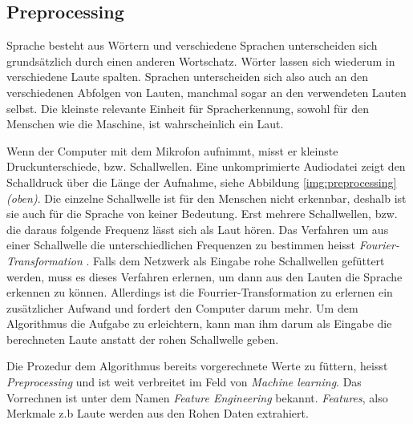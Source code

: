 \subsection{Preprocessing}
Sprache besteht aus Wörtern und verschiedene Sprachen unterscheiden sich grundsätzlich durch einen anderen Wortschatz. Wörter lassen sich wiederum in verschiedene Laute spalten. Sprachen unterscheiden sich also auch an den verschiedenen Abfolgen von Lauten, manchmal sogar an den verwendeten Lauten selbst. Die kleinste relevante Einheit für Spracherkennung, sowohl für den Menschen wie die Maschine, ist wahrscheinlich ein Laut.

Wenn der Computer mit dem Mikrofon aufnimmt, misst er kleinste Druckunterschiede, bzw. Schallwellen. Eine unkomprimierte Audiodatei zeigt den Schalldruck über die Länge der Aufnahme, siehe Abbildung \ref{img:preprocessing} \textit{(oben)}.
Die einzelne Schallwelle ist für den Menschen nicht erkennbar, deshalb ist sie auch für die Sprache von keiner Bedeutung. Erst mehrere Schallwellen, bzw. die daraus folgende Frequenz lässt sich als Laut hören. 
Das Verfahren um aus einer Schallwelle die unterschiedlichen Frequenzen zu bestimmen heisst \textit{Fourier-Transformation} \cite{fourrier}. Falls dem Netzwerk als Eingabe rohe Schallwellen gefüttert werden, muss es dieses Verfahren erlernen, um dann aus den Lauten die Sprache erkennen zu können. Allerdings ist die Fourrier-Transformation zu erlernen ein zusätzlicher Aufwand und fordert den Computer darum mehr. Um dem Algorithmus die Aufgabe zu erleichtern, kann man ihm darum als Eingabe die berechneten Laute anstatt der rohen Schallwelle geben.

Die Prozedur dem Algorithmus bereits vorgerechnete Werte zu füttern, heisst \textit{Preprocessing} und ist weit verbreitet im Feld von \textit{Machine learning}. Das Vorrechnen ist unter dem Namen \textit{Feature Engineering} bekannt. \textit{Features}, also Merkmale z.b Laute werden aus den Rohen Daten extrahiert. \parencite[vgl.][]{chollet}

